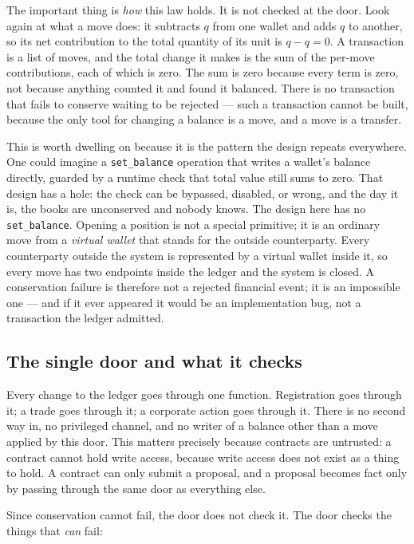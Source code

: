 The important thing is \emph{how} this law holds. It is not checked at the door.
Look again at what a move does: it subtracts $q$ from one wallet and adds $q$ to
another, so its net contribution to the total quantity of its unit is $q - q = 0$.
A transaction is a list of moves, and the total change it makes is the sum of the
per-move contributions, each of which is zero. The sum is zero because every term
is zero, not because anything counted it and found it balanced. There is no
transaction that fails to conserve waiting to be rejected --- such a transaction
cannot be built, because the only tool for changing a balance is a move, and a
move is a transfer.

This is worth dwelling on because it is the pattern the design repeats
everywhere. One could imagine a \texttt{set\_balance} operation that writes a
wallet's balance directly, guarded by a runtime check that total value still sums
to zero. That design has a hole: the check can be bypassed, disabled, or wrong,
and the day it is, the books are unconserved and nobody knows. The design here has
no \texttt{set\_balance}. Opening a position is not a special primitive; it is an
ordinary move from a \emph{virtual wallet} that stands for the outside
counterparty. Every counterparty outside the system is represented by a virtual
wallet inside it, so every move has two endpoints inside the ledger and the system
is closed. A conservation failure is therefore not a rejected financial event; it
is an impossible one --- and if it ever appeared it would be an implementation
bug, not a transaction the ledger admitted.

\subsection{The single door and what it checks}

Every change to the ledger goes through one function. Registration goes through
it; a trade goes through it; a corporate action goes through it. There is no
second way in, no privileged channel, and no writer of a balance other than a move
applied by this door. This matters precisely because contracts are untrusted: a
contract cannot hold write access, because write access does not exist as a thing
to hold. A contract can only submit a proposal, and a proposal becomes fact only
by passing through the same door as everything else.

Since conservation cannot fail, the door does not check it. The door checks the
things that \emph{can} fail:

